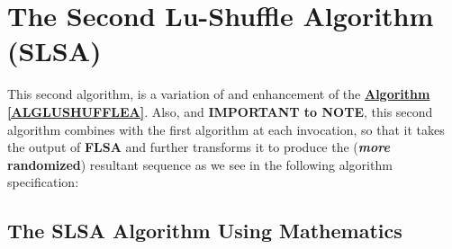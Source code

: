 \documentclass[a4paper, 18pt]{book} %
\begin{document}
\section{The Second Lu-Shuffle Algorithm (SLSA)}
\label{APPSLSA}

This second algorithm, is a variation of and enhancement of the \textbf{\hyperref[ALGLUSHUFFLEA]{Algorithm \ref{ALGLUSHUFFLEA}}}. Also, and \textbf{IMPORTANT to NOTE}, this second algorithm combines with the first algorithm at each invocation, so that it takes the output of \textbf{FLSA} and further transforms it to produce the (\textbf{\textit{more} randomized}) resultant  sequence as we see in the following algorithm specification:

\subsection{The SLSA Algorithm Using Mathematics}
\end{document}
